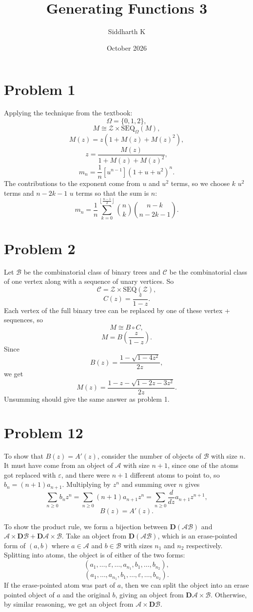 \documentclass{article}
\title{Generating Functions 3}
\author{Siddharth K}
\date{October 2026}
\newcommand{\mcA}{\mathcal{A}}
\newcommand{\mcB}{\mathcal{B}}
\newcommand{\mcC}{\mathcal{C}}
\newcommand{\mcZ}{\mathcal{Z}}
\newcommand{\bigp}[1]{\left(#1\right)}
\newcommand{\eps}{\varepsilon}
\begin{document}
\maketitle

\section*{Problem 1}
Applying the technique from the textbook:
$$\Omega = \{0, 1, 2\},$$
$$M \cong \mcZ \times \mathrm{SEQ}_\Omega(M),$$
$$M(z) = z(1 + M(z) + M(z)^2),$$
$$z = \frac{M(z)}{1 + M(z) + M(z)^2},$$
$$m_n = \frac{1}{n}[u^{n - 1}](1 + u + u^2)^n.$$
The contributions to the exponent come from $u$ and $u^2$ terms, so we choose $k$ $u^2$ terms and $n - 2k - 1$ $u$ terms so that the sum is $n$:
$$m_n = \frac{1}{n}\sum_{k = 0}^{\left\lfloor\frac{n - 1}{2}\right\rfloor} \binom{n}{k}\binom{n - k}{n - 2k - 1}.$$

\section*{Problem 2}
Let $\mcB$ be the combinatorial class of binary trees and $\mcC$ be the combinatorial class of one vertex along with a sequence of unary vertices. So
$$\mcC = \mcZ \times \mathrm{SEQ}(\mcZ),$$
$$C(z) = \frac{z}{1 - z}.$$
Each vertex of the full binary tree can be replaced by one of these vertex + sequences, so
$$M \cong B \circ C,$$
$$M = B\bigp{\frac{z}{1 - z}}.$$
Since
$$B(z) = \frac{1 - \sqrt{1 - 4z^2}}{2z},$$
we get
$$M(z) = \frac{1 - z - \sqrt{1 - 2z - 3z^2}}{2z}.$$
Unsumming should give the same answer as problem 1.

\section*{Problem 12}
To show that $B(z) = A'(z)$, consider the number of objects of $\mcB$ with size $n$. It must have come from an object of $\mcA$ with size $n + 1$, since one of the atoms got replaced with $\eps$, and there were $n + 1$ different atoms to point to, so $b_n = (n + 1)a_{n + 1}$. Multiplying by $z^n$ and summing over $n$ gives
$$\sum_{n \ge 0} b_nz^n = \sum_{n \ge 0}(n + 1)a_{n + 1}z^n = \sum_{n \ge 0}\frac{d}{dz}a_{n + 1}z^{n + 1},$$
$$B(z) = A'(z).$$

To show the product rule, we form a bijection between $\mathbf{D}(\mcA \mcB)$ and $\mcA \times \mathbf{D}\mcB + \mathbf{D}\mcA \times \mcB$. Take an object from $\mathbf{D}(\mcA \mcB)$, which is an erase-pointed form of $(a, b)$ where $a \in \mcA$ and $b \in \mcB$ with sizes $n_1$ and $n_2$ respectively. Splitting into atoms, the object is of either of the two forms:
$$(a_1, \ldots, \eps, \ldots, a_{n_1}, b_1, \ldots, b_{n_2}),$$
$$(a_1, \ldots, a_{n_1}, b_1, \ldots, \eps, \ldots, b_{n_2}).$$
If the erase-pointed atom was part of $a$, then we can split the object into an erase pointed object of $a$ and the original $b$, giving an object from $\mathbf{D}\mcA \times \mcB$. Otherwise, by similar reasoning, we get an object from $\mcA \times \mathbf{D}\mcB$.
\end{document}
